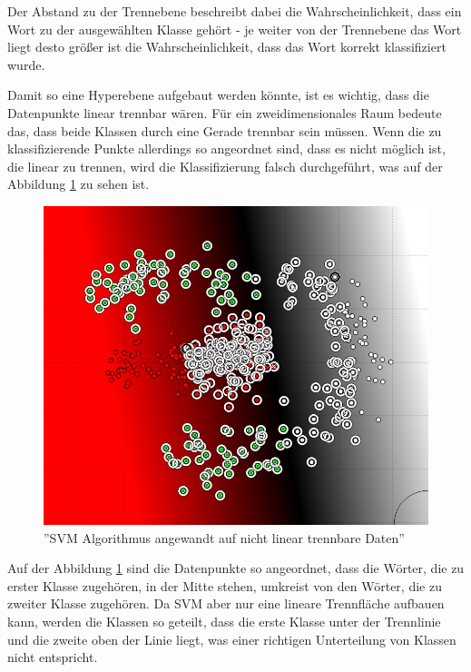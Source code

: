 Der Abstand zu der Trennebene beschreibt dabei die Wahrscheinlichkeit, dass ein Wort zu der ausgewählten Klasse gehört - je weiter von der Trennebene das Wort liegt desto größer ist die Wahrscheinlichkeit, dass das Wort korrekt klassifiziert wurde.

Damit so eine Hyperebene aufgebaut werden könnte, ist es wichtig, dass die Datenpunkte linear trennbar wären. Für ein zweidimensionales Raum bedeute das, dass beide Klassen durch eine Gerade trennbar sein müssen. Wenn die zu klassifizierende Punkte allerdings so angeordnet sind, dass es nicht möglich ist, die linear zu trennen, wird die Klassifizierung falsch durchgeführt, was auf der Abbildung \ref{fig:SVM-NONLINEAR-ISSUE} zu sehen ist.

\begin{figure}
\centering
\includegraphics[width=\textwidth,angle=90]{Bilder/svm-nonlinear-issue.png}
\caption{''SVM Algorithmus angewandt auf nicht linear trennbare Daten''}
\label{fig:SVM-NONLINEAR-ISSUE}
\end{figure}

Auf der Abbildung \ref{fig:SVM-NONLINEAR-ISSUE} sind die Datenpunkte so angeordnet, dass die Wörter, die zu erster Klasse zugehören, in der Mitte stehen, umkreist von den Wörter, die zu zweiter Klasse zugehören. Da SVM aber nur eine lineare Trennfläche aufbauen kann, werden die Klassen so geteilt, dass die erste Klasse unter der Trennlinie und die zweite oben der Linie liegt, was einer richtigen Unterteilung von Klassen nicht entspricht.


